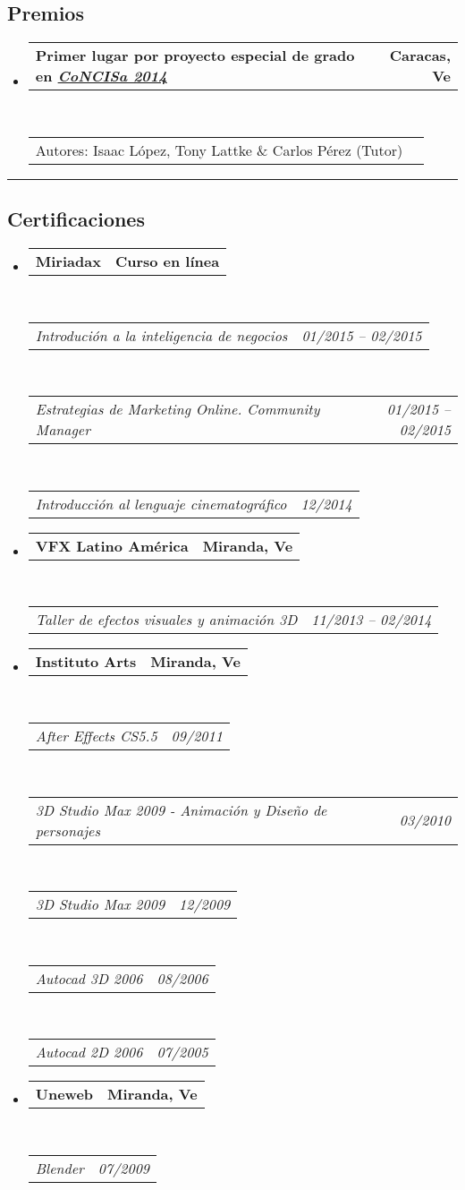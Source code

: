 \documentclass[10pt,letterpaper]{article}
\makeatletter
\newcommand{\headerrow}[2]
{\begin{tabular*}{\linewidth}{l@{\extracolsep{\fill}}r}
	#1 &
	#2 \\
\end{tabular*}}
\makeatother
\begin{document}
\subsection*{Premios}

\begin{itemize}
  \parskip=0.1em
\item 
   \headerrow
   {\textbf{Primer lugar por proyecto especial de grado en \emph{\href{http://www.concisa.net.ve/2014/}{CoNCISa 2014}}}}
   {\textbf{Caracas, Ve}}
  \\
  \headerrow
   {Autores: Isaac López, Tony Lattke \& Carlos Pérez (Tutor)}{}
\end{itemize}

\hrule
\vspace{-0.4em}
\subsection*{Certificaciones}

\begin{itemize}
	\parskip=0.1em

\item 
   \headerrow
   {\textbf{Miriadax}}
   {\textbf{Curso en línea}}
  \\
  \headerrow
   {\emph{Introdución a la inteligencia de negocios}}
   {\emph{01/2015 -- 02/2015}}
  \\
  \headerrow
   {\emph{Estrategias de Marketing Online. Community Manager}}
   {\emph{01/2015 -- 02/2015}}
  \\
  \headerrow
   {\emph{Introducción al lenguaje cinematográfico}}
   {\emph{12/2014}}
\item 
   \headerrow
   {\textbf{VFX Latino América}}
   {\textbf{Miranda, Ve}}
  \\
  \headerrow
   {\emph{Taller de efectos visuales y animación 3D}}
   {\emph{11/2013 -- 02/2014}}

\item 
   \headerrow
   {\textbf{Instituto Arts}}
   {\textbf{Miranda, Ve}}
	\\
	\headerrow
   {\emph{After Effects CS5.5}}
   {\emph{09/2011}}
	\\
	\headerrow
   {\emph{3D Studio Max 2009 - Animación y Diseño de personajes}}
   {\emph{03/2010}}
	\\
	\headerrow
   {\emph{3D Studio Max 2009}}
   {\emph{12/2009}}
	\\
	\headerrow
   {\emph{Autocad 3D 2006}}
   {\emph{08/2006}}
	\\
	\headerrow
   {\emph{Autocad 2D 2006}}
   {\emph{07/2005}}

\item 
   \headerrow
   {\textbf{Uneweb}}
   {\textbf{Miranda, Ve}}
	\\
	\headerrow
   {\emph{Blender}}
   {\emph{07/2009}}
\end{itemize}
\end{document}
